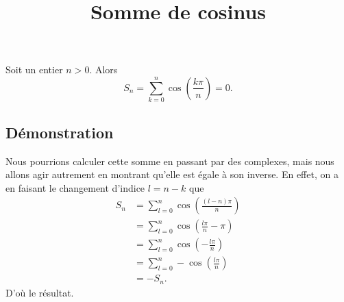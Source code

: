 \documentclass[fontsize=12pt,twoside=false,parskip=half, french]{scrartcl}
\title{Somme de cosinus}
\date{}
\author{}
\begin{document}
\maketitle
   \begin{Theoreme}
      Soit un entier $n > 0$. Alors
      \begin{equation}
         S_n = \sum_{k = 0}^n \cos\left(\frac{k\pi}{n} \right) = 0.
      \end{equation}
   \end{Theoreme}
   \subsection{Démonstration}
       Nous pourrions calculer cette somme en passant par des complexes, mais
       nous allons agir autrement en montrant qu'elle est égale à son inverse.
       En effet, on a en faisant le changement d'indice $l = n - k$ que
       \begin{align*}
           S_n &= \sum_{l = 0}^{n} \cos\left( \frac{(l - n)\pi}{n} \right)\\
               &= \sum_{l = 0}^{n} \cos\left(\frac{l\pi}{n} - \pi \right)\\
               &= \sum_{l = 0}^{n} \cos\left(-\frac{l\pi}{n} \right)\\
               &= \sum_{l = 0}^{n} -\cos\left(\frac{l\pi}{n} \right)\\
               &= -S_n.
       \end{align*}
       D'où le résultat.
\end{document}
